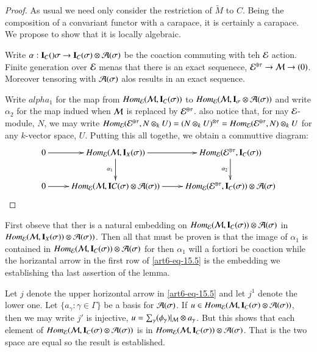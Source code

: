 \begin{proof}
As usual we need only consider the restriction of $\widetilde{M}$ to $C$. Being the composition of a convariant functor with a carapace, it is certainly a carapace. We propose to show that it is locally algebraic.

Write $\alpha : \mathbf{I}_{C}()\sigma \rightarrow \mathbf{I}_{C}(\sigma)\otimes \mathcal{A}(\sigma)$ be the coaction commuting with teh $\mathcal{E}$ action. Finite generation over $\mathcal{E}$ menas that there is an exact sequenece, $\mathcal{E}^{\oplus \tau}\rightarrow \mathcal{M} \rightarrow (0)$. Moreover tensoring with $\mathcal{A}(\sigma)$ alos results in an exact sequence.

Write $alpha_{1}$ for the map from $Hom_{\mathcal{E}}(\mathcal{M}, \mathbf{I}_{C}(\sigma))$ to $Hom_{\mathcal{E}}(\mathcal{M}, \mathbf{I}_{\sigma} \otimes \mathcal{A} (\sigma))$ and write $\alpha_{2}$ for the map indued when $\mathcal{M}$ is replaced by $\mathcal{E}^{\oplus \tau}$. also notice that, for nay $\mathcal{E}$-module, $N$, we may write $Hom_{\mathcal{E}}(\mathcal{E}^{\oplus \tau}, N \otimes_{k} U) = (N \otimes_{k} U)^{\otimes \tau} = Hom_{\mathcal{E}}(\mathcal{E}^{\oplus \tau}, N)\otimes_{k} U$ for any $k$-vector space, $U$. Putting this all togethe, we obtain a commuttive diagram:
\begin{equation}\label{art6-eq-15.5}
\vcenter{
\xymatrix{
0 \ar[r] & Hom_{\calE}(\calM, \bI_{X}(\sigma))\ar[d]_-{\alpha_{1}} \ar[r]& Hom_{\calE}(\calE^{\oplus \tau}, \bI_{C}(\sigma))\ar[d]_-{\alpha_{2}}\\
0 \ar[r] & Hom_{\calE}(\calM, \bI{C}(\sigma) \otimes \calA(\sigma)) \ar[r] & Hom_{\calE}(\calE^{\oplus \tau}, \bI_{C}(\sigma)) \otimes \calA(\sigma)
}}
\end{equation}


\end{proof}
 First obseve that ther is a natural embedding on $Hom_{\mathcal{E}}(\mathcal{M}, \mathbf{I}_{C}(\sigma)) \otimes \mathcal{A}(\sigma)$ in $Hom_{\mathcal{E}}(\mathcal{M}, \mathbf{I}_{X}(\sigma))\otimes \mathcal{A}(\sigma))$. Then all that must be proven is that the image of $\alpha_{1}$ is contained in $Hom_{\mathcal{E}}(\mathcal{M}, \mathbf{I}_{C}(\sigma)) \otimes \mathcal{A}(\sigma)$ for then $\alpha_{1}$ will a fortiori be coaction while the horizantal arrow in the first row of \ref{art6-eq-15.5} is the embedding we establishing tha last assertion of the lemma.

 Let $j$ denote the upper horizontal arrow in \ref{art6-eq-15.5} and let $j^{1}$ denote the lower one. Let $\{a_{\gamma}: \gamma \in \Gamma\}$ be a basis for $\mathcal{A}(\sigma)$. If $u \in Hom_{\mathcal{E}}(\mathcal{M}, \mathbf{I}_{C}(\sigma) \otimes \mathcal{A}(\sigma))$, then we may write $j'$ is injective, $u = \sum_{\gamma}(\phi_{\gamma})|_{\mathcal{M}} \otimes a_{\gamma}$. But this shows that each element of $Hom_{\mathcal{E}}(\mathcal{M}, \mathbf{I}_{C}(\sigma) \otimes \mathcal{A}(\sigma))$ is in $Hom_{\calE}(\calM, \bI_{C}\break (\sigma)) \otimes \calA(\sigma)$. That is the two space are equal so the result is established.


